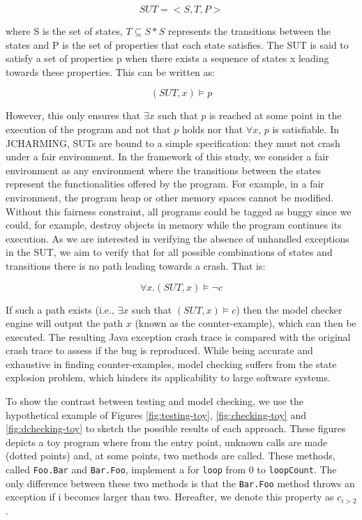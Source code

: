 \documentclass[times]{smrauth}
\begin{document}
\begin{equation}
SUT = <S,T,P>
\end{equation}

where S is the set of states, $T \subseteq S * S$ represents the transitions between the states and P is the set of properties that each state satisfies. The SUT is said to satisfy a set of properties p when there exists a sequence of states x leading towards these properties. This can be written as:

\begin{equation}
(SUT, x)  \models p
\end{equation}

However, this only ensures that $\exists x$ such that $p$ is reached at some point in the execution of the program and not that $p$ holds nor that $\forall x$, $p$ is satisfiable. In JCHARMING, SUTs are bound to a simple specification: they must not crash under a fair environment. In the framework of this study, we consider a fair environment as any environment where the transitions between the states represent the functionalities offered by the program. For example, in a fair environment, the program heap or other memory spaces cannot be modified. Without this fairness constraint, all programs could be tagged as buggy since we could, for example, destroy objects in memory while the program continues its execution. As we are interested in verifying the absence of unhandled exceptions in the SUT, we aim to verify that for all possible combinations of states and transitions there is no path leading towards a crash. That is:

\begin{equation}
\forall x.(SUT, x) \models \neg c
\end{equation}

If such a path exists (i.e., $\exists x$  such that $(SUT, x)  \models c$) then the model checker engine will output the path $x$ (known as the counter-example), which can then be executed. The resulting Java exception crash trace is compared with the original crash trace to assess if the bug is reproduced. While  being  accurate and exhaustive in finding counter-examples, model checking suffers from the state explosion problem, which hinders its applicability to large software systems.


To show the contrast between testing and model checking, we use the hypothetical example of Figures \ref{fig:testing-toy}, \ref{fig:checking-toy} and \ref{fig:dchecking-toy} to sketch the possible results of each approach. These figures depicts a toy program where from the entry point, unknown calls are made (dotted points) and, at some points, two methods are called. These methods, called \texttt{Foo.Bar} and \texttt{Bar.Foo}, implement a for \texttt{loop} from 0 to \texttt{loopCount}. The only difference between these two methods is that the \texttt{Bar.Foo} method throws an exception if i becomes larger than two. Hereafter, we denote this property as $c_{i > 2}$.  
\end{document}
